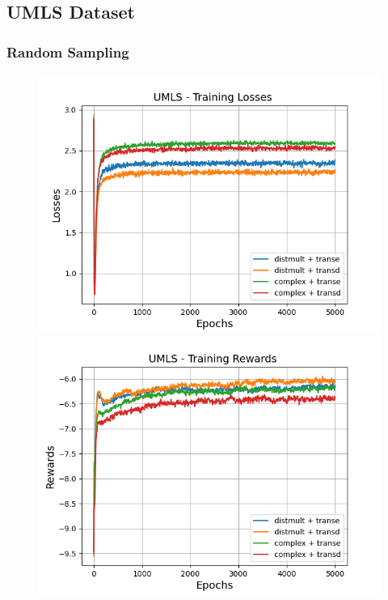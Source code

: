 \subsection{UMLS Dataset}

\subsubsection{Random Sampling}
\begin{figure}
    \centering
    \begin{minipage}{.5\textwidth}
      \centering
      \includegraphics[width=0.9\linewidth]{figures/results/gan_train/not_pretrained/random/umls/gan_train_random_umls_losses.png}
    \end{minipage}%
    \begin{minipage}{.5\textwidth}
      \centering
      \includegraphics[width=0.9\linewidth]{figures/results/gan_train/not_pretrained/random/umls/gan_train_random_umls_rewards.png}

\end{minipage}
\end{figure}
